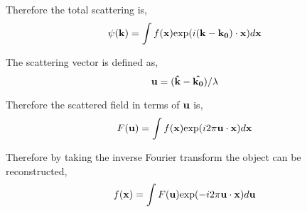 \documentclass[12pt]{article}
\begin{document}
Therefore the total scattering is,
\begin{equation}
    \psi(\vb{k}) = \int f(\vb{x}) \textrm{exp}(i(\vb{k}-\vb{k_0}) \cdot \vb{x}) d\vb{x}
\end{equation}

The scattering vector is defined as,
\begin{equation}
    \vb{u} = (\vb{\hat{k}}-\vb{\hat{k_0}})/\lambda
\end{equation}

Therefore the scattered field in terms of $\vb{u}$ is,
\begin{equation}
    F(\vb{u})=\int f(\vb{x}) \textrm{exp}(i2\pi \vb{u} \cdot \vb{x}) d\vb{x}
\end{equation}

Therefore by taking the inverse Fourier transform the object can be reconstructed,
\begin{equation}
    f(\vb{x}) = \int F(\vb{u}) \textrm{exp} (-i2\pi \vb{u} \cdot \vb{x}) d\vb{u}
\end{equation}
\end{document}
